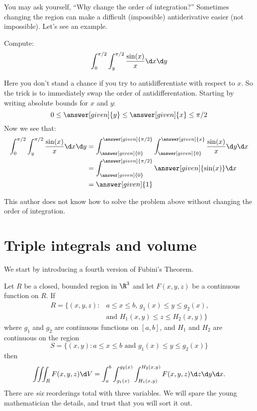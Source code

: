 \documentclass{ximera}
\begin{document}
You may ask yourself, ``Why change the order of integration?''
Sometimes changing the region can make a difficult (impossible)
antiderivative easier (not impossible). Let's see an example.

\begin{example}
  Compute:
  \[
  \int_0^{\pi/2}\int_y^{\pi/2} \frac{\sin(x)}{x} \d x \d y
  \]
  \begin{explanation}
    Here you don't stand a chance if you try to antidifferentiate with
    respect to $x$. So the trick is to immediately swap the order of
    antidifferentation. Starting by writing absolute bounds for $x$
    and $y$:
    \[
    0\le \answer[given]{y}\le \answer[given]{x}\le\pi/2
    \]
    Now we see that:
    \begin{align*}
      \int_0^{\pi/2}\int_y^{\pi/2} \frac{\sin(x)}{x} \d x \d y &= \int_{\answer[given]{0}}^{\answer[given]{\pi/2}}\int_{\answer[given]{0}}^{\answer[given]{x}} \frac{\sin(x)}{x} \d y \d x\\
      &= \int_{\answer[given]{0}}^{\answer[given]{\pi/2}} \answer[given]{\sin(x)} \d x\\
      &=\answer[given]{1}
    \end{align*}
  \end{explanation}
\end{example}

This author does not know how to solve the problem above without
changing the order of integration.









\section{Triple integrals and volume}

We start by introducing a fourth version of Fubini's Theorem.

\begin{theorem}[Fubini]
  Let $R$ be a closed, bounded region in $\R^3$ and let $F(x,y,z)$ be
  a continuous function on $R$. If
    \begin{align*}
      R=\{(x,y,z):&\text{$a\leq x\leq b$, $g_1(x)\leq y\leq g_2(x)$,}\\
        &\text{and $H_1(x,y) \leq z \leq H_2(x,y)$}\}
    \end{align*}
    where $g_1$ and $g_2$ are continuous functions on $[a,b]$, and $H_1$ and $H_2$ are continuous on the region
    \[
    S =\{(x,y):\text{$a\leq x\leq b$ and $g_1(x)\leq y\leq g_2(x)$}\}
    \]
    then
    \[
    \iiint_R F(x,y,z) \d V = \int_a^b\int_{g_1(x)}^{g_2(x)}\int_{H_1(x,y)}^{H_2(x,y)} F(x,y,z)\d z\d y\d x.
    \]
    There are \textit{six} reorderings total with three variables. We will spare
    the young mathematician the details, and trust that you will sort
    it out.
\end{theorem}
\end{document}
